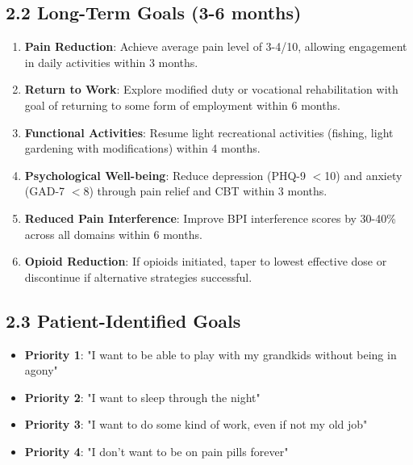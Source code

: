 \documentclass[11pt,letterpaper]{article}
\begin{document}
\subsection*{2.2 Long-Term Goals (3-6 months)}

\begin{enumerate}[leftmargin=*]
    \item \textbf{Pain Reduction}: Achieve average pain level of 3-4/10, allowing engagement in daily activities within 3 months.
    
    \item \textbf{Return to Work}: Explore modified duty or vocational rehabilitation with goal of returning to some form of employment within 6 months.
    
    \item \textbf{Functional Activities}: Resume light recreational activities (fishing, light gardening with modifications) within 4 months.
    
    \item \textbf{Psychological Well-being}: Reduce depression (PHQ-9 $<$10) and anxiety (GAD-7 $<$8) through pain relief and CBT within 3 months.
    
    \item \textbf{Reduced Pain Interference}: Improve BPI interference scores by 30-40\% across all domains within 6 months.
    
    \item \textbf{Opioid Reduction}: If opioids initiated, taper to lowest effective dose or discontinue if alternative strategies successful.
\end{enumerate}

\subsection*{2.3 Patient-Identified Goals}

\begin{itemize}[leftmargin=*]
    \item \textbf{Priority 1}: "I want to be able to play with my grandkids without being in agony"
    \item \textbf{Priority 2}: "I want to sleep through the night"
    \item \textbf{Priority 3}: "I want to do some kind of work, even if not my old job"
    \item \textbf{Priority 4}: "I don't want to be on pain pills forever"
\end{itemize}
\end{document}
